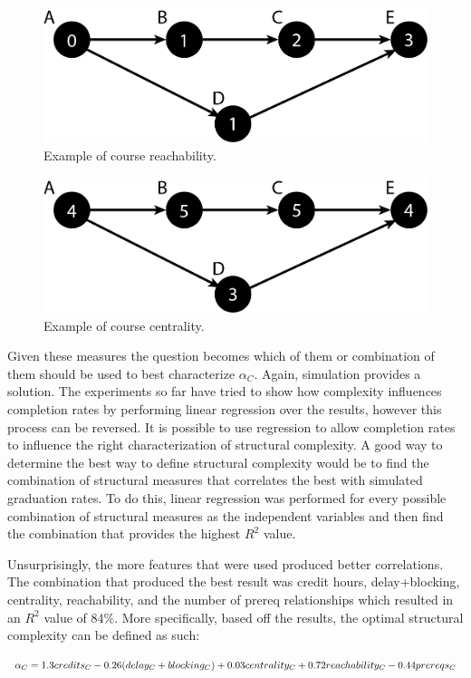 \documentclass[botnum, fleqn]{unmeethesis}
\begin{document}
      \begin{figure}
        \centering
        \includegraphics[width=0.4\linewidth]{./figures/Reachability.png}
        \caption{Example of course reachability.}
        \label{fig:Reachability}
      \end{figure}
      \vspace{0.5in}

      \begin{figure}
        \centering
        \includegraphics[width=0.4\linewidth]{./figures/Centrality.png}
        \caption{Example of course centrality.}
        \label{fig:Centrality}
      \end{figure}

      Given these measures the question becomes which of them or combination of them should be used to best characterize $\alpha_C$. Again, simulation provides a solution. The experiments so far have tried to show how complexity influences completion rates by performing linear regression over the results, however this process can be reversed. It is possible to use regression to allow completion rates to influence the right characterization of structural complexity. A good way to determine the best way to define structural complexity would be to find the combination of structural measures that correlates the best with simulated graduation rates. To do this, linear regression was performed for every possible combination of structural measures as the independent variables and then find the combination that provides the highest $R^2$ value.

      Unsurprisingly, the more features that were used produced better correlations. The combination that produced the best result was credit hours, delay+blocking, centrality, reachability, and the number of prereq relationships which resulted in an $R^2$ value of 84\%. More specifically, based off the results, the optimal structural complexity can be defined as such:

      \begin{tiny}
      \[
        \alpha_C = 1.3credits_C - 0.26(delay_C+blocking_C) \\ + 0.03centrality_C + 0.72reachability_C - 0.44prereqs_C
      \]
      \end{tiny}
\end{document}
